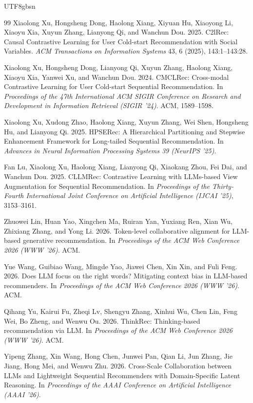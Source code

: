 \documentclass{article}
\begin{document}
\begin{CJK*}{UTF8}{gbsn}
\begin{thebibliography}{99}
Xiaolong Xu, Hongsheng Dong, Haolong Xiang, Xiyuan Hu, Xiaoyong Li, Xiaoyu Xia, Xuyun Zhang, Lianyong Qi, and Wanchun Dou. 2025.
C2lRec: Causal Contrastive Learning for User Cold-start Recommendation with Social Variables.
\textit{ACM Transactions on Information Systems} 43, 6 (2025), 143:1--143:28.

Xiaolong Xu, Hongsheng Dong, Lianyong Qi, Xuyun Zhang, Haolong Xiang, Xiaoyu Xia, Yanwei Xu, and Wanchun Dou. 2024.
CMCLRec: Cross-modal Contrastive Learning for User Cold-start Sequential Recommendation.
In \textit{Proceedings of the 47th International ACM SIGIR Conference on Research and Development in Information Retrieval (SIGIR '24)}. ACM, 1589--1598.

Xiaolong Xu, Xudong Zhao, Haolong Xiang, Xuyun Zhang, Wei Shen, Hongsheng Hu, and Lianyong Qi. 2025.
HPSERec: A Hierarchical Partitioning and Stepwise Enhancement Framework for Long-tailed Sequential Recommendation.
In \textit{Advances in Neural Information Processing Systems 39 (NeurIPS '25)}.

Fan Lu, Xiaolong Xu, Haolong Xiang, Lianyong Qi, Xiaokang Zhou, Fei Dai, and Wanchun Dou. 2025.
CLLMRec: Contrastive Learning with LLMs-based View Augmentation for Sequential Recommendation.
In \textit{Proceedings of the Thirty-Fourth International Joint Conference on Artificial Intelligence (IJCAI '25)}, 3153--3161.

Zhuowei Lin, Huan Yao, Xingchen Ma, Ruiran Yan, Yuxiang Ren, Xian Wu, Zhixiang Zhang, and Yong Li. 2026.
Token-level collaborative alignment for LLM-based generative recommendation.
In \textit{Proceedings of the ACM Web Conference 2026 (WWW '26)}. ACM.

Yue Wang, Guibiao Wang, Mingde Yao, Jiawei Chen, Xin Xin, and Fuli Feng. 2026.
Does LLM focus on the right words? Mitigating context bias in LLM-based recommenders.
In \textit{Proceedings of the ACM Web Conference 2026 (WWW '26)}. ACM.

Qihang Yu, Kairui Fu, Zheqi Lv, Shengyu Zhang, Xinhui Wu, Chen Lin, Feng Wei, Bo Zheng, and Wenwu Ou. 2026.
ThinkRec: Thinking-based recommendation via LLM.
In \textit{Proceedings of the ACM Web Conference 2026 (WWW '26)}. ACM.

Yipeng Zhang, Xin Wang, Hong Chen, Junwei Pan, Qian Li, Jun Zhang, Jie Jiang, Hong Mei, and Wenwu Zhu. 2026.
Cross-Scale Collaboration between LLMs and Lightweight Sequential Recommenders with Domain-Specific Latent Reasoning.
In \textit{Proceedings of the AAAI Conference on Artificial Intelligence (AAAI '26)}.


\end{thebibliography}
\end{CJK*}
\end{document}
